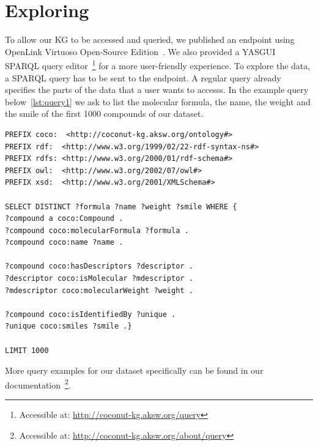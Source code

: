 \documentclass[
]{ceurart}
\begin{document}
\section{Exploring}
To allow our KG to be accessed and queried, we published an endpoint using OpenLink Virtuoso Open-Source Edition~\cite{erling2012virtuoso}. We also provided a YASGUI~\cite{rietveld2017yasgui} SPARQL query editor~\footnote{Accessible at: \url{http://coconut-kg.aksw.org/query}} for a more user-friendly experience.
To explore the data, a SPARQL query has to be sent to the endpoint. A regular query already specifies the parts of the data that a user wants to accesss.
In the example query below~\ref{lst:query1} we ask to list the molecular formula, the name, the weight and the smile of the first 1000 compounds of our dataset.

\begin{lstlisting}[language=sparql, label=lst:query1, caption=Example SPARQL query]
PREFIX coco:  <http://coconut-kg.aksw.org/ontology#>
PREFIX rdf:  <http://www.w3.org/1999/02/22-rdf-syntax-ns#>
PREFIX rdfs: <http://www.w3.org/2000/01/rdf-schema#>
PREFIX owl:  <http://www.w3.org/2002/07/owl#>
PREFIX xsd:  <http://www.w3.org/2001/XMLSchema#>

SELECT DISTINCT ?formula ?name ?weight ?smile WHERE {
?compound a coco:Compound .
?compound coco:molecularFormula ?formula .
?compound coco:name ?name .

?compound coco:hasDescriptors ?descriptor .
?descriptor coco:isMolecular ?mdescriptor .
?mdescriptor coco:molecularWeight ?weight .

?compound coco:isIdentifiedBy ?unique .
?unique coco:smiles ?smile .}

LIMIT 1000
\end{lstlisting}

More query examples for our dataset specifically can be found in our documentation~\footnote{Accessible at: \url{http://coconut-kg.aksw.org/about/query}}.

\begin{table}[h]
    \centering
    \caption{Average execution time statistics for Query \ref{lst:query1}.}
    \label{tab:execution time}
\end{table}
\end{document}

